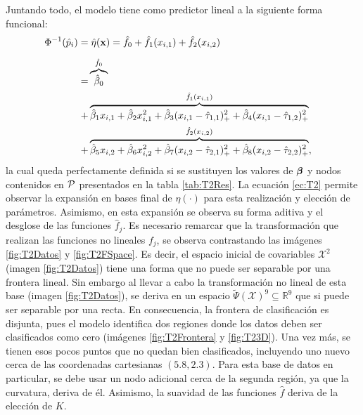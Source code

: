 \documentclass[../Main/Main.tex]{subfiles}
\begin{document}
Juntando todo, el modelo tiene como predictor lineal a la siguiente forma funcional:
\begin{align}
	\Phi^{-1}(\hat{p}_i) = &\; \hat{\eta}(\xsn) = \hat{f}_0 + \hat{f}_1(x_{i,1}) +  \hat{f}_2(x_{i,2}) \label{ec:T2}\\[5pt]	
	= & \overbrace{\hat{\beta}_0}^{\hat{f}_0} \nonumber \\ 
	+ & \overbrace{\hat{\beta}_1x_{i,1} + \hat{\beta}_2x_{i,1}^2 
+ \hat{\beta}_3(x_{i,1} - \hat{\t}_{1,1})_+^2 + \hat{\beta}_4(x_{i,1} - \hat{\t}_{1,2})_+^2}^{\hat{f}_1(x_{i,1})} \nonumber \\
	+ & \overbrace{\hat{\beta}_5x_{i,2} + \hat{\beta}_6x_{i,2}^2 
+ \hat{\beta}_7(x_{i,2} - \hat{\t}_{2,1})_+^2 + \hat{\beta}_8(x_{i,2} - \hat{\t}_{2,2})_+^2}^{\hat{f}_2(x_{i,2})},\quad \nonumber
\end{align}
la cual queda perfectamente definida si se sustituyen los valores de $\betabf$ y nodos contenidos en $\P$ presentados en la tabla \ref{tab:T2Res}. La ecuación \eqref{ec:T2} permite observar la expansión en bases final de $\eta(\cdot)$ para esta realización y elección de parámetros. Asimismo, en esta expansión se observa su forma aditiva y el desglose de las funciones $\hat{f}_j$. Es necesario remarcar que la transformación que realizan las funciones no lineales $f_j$, se observa contrastando las imágenes \ref{fig:T2Datos} y \ref{fig:T2FSpace}. Es decir, el espacio inicial de covariables $\mathcal{X}^2$ (imagen \ref{fig:T2Datos}) tiene una forma que no puede ser separable por una frontera lineal. Sin embargo al llevar a cabo la transformación no lineal de esta base (imagen \ref{fig:T2Datos}), se deriva en un espacio $\widetilde{\Psi}(\mathcal{X})^{9} \subseteq \mathbb{R}^9$ que si puede ser separable por una recta. En consecuencia, la frontera de clasificación es disjunta, pues el modelo identifica dos regiones donde los datos deben ser clasificados como cero (imágenes \ref{fig:T2Frontera} y \ref{fig:T23D}). Una vez más, se tienen esos pocos puntos que no quedan bien clasificados, incluyendo uno nuevo cerca de las coordenadas cartesianas $(5.8, 2.3)$. Para esta base de datos en particular, se debe usar un nodo adicional cerca de la segunda región, ya que la curvatura, deriva de él. Asimismo, la suavidad de las funciones $\hat{f}$ deriva de la elección de $K$.
\end{document}
